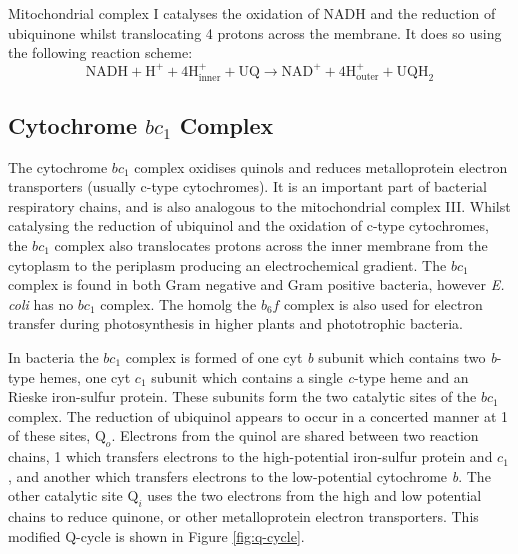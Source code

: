 Mitochondrial complex I catalyses the oxidation of NADH and the reduction of ubiquinone whilst translocating 4 protons across the membrane. It does so using the following reaction scheme:
\begin{equation}
\mathrm{NADH} + \mathrm{H}^+ + 4\mathrm{H}^+_{\mathrm{inner}} + \mathrm{UQ} \rightarrow \mathrm{NAD}^+ + 4\mathrm{H}^+_{\mathrm{outer}} + \mathrm{UQH}_2
\end{equation}

\subsection{Cytochrome $bc_\mathrm{1}$ Complex}
The cytochrome $bc_\mathrm{1}$ complex oxidises quinols and reduces metalloprotein electron transporters (usually c-type cytochromes). It is an important part of bacterial respiratory chains, and is also analogous to the mitochondrial complex III\cite{Thoeny-Meyer1997}. Whilst catalysing the reduction of ubiquinol and the oxidation of c-type cytochromes, the $bc_\mathrm{1}$ complex also translocates protons across the inner membrane from the cytoplasm to the periplasm producing an electrochemical gradient. The $bc_\mathrm{1}$ complex is found in both Gram negative and Gram positive bacteria, however \textit{E. coli} has no $bc_\mathrm{1}$ complex. The homolg the $b_6f$ complex is also used for electron transfer during photosynthesis in higher plants and phototrophic bacteria\cite{Darrouzet1999}.

In bacteria the $bc_1$ complex is formed of one cyt \textit{b} subunit which contains two \textit{b}-type hemes, one cyt $c_1$ subunit which contains a single \textit{c}-type heme and an Rieske iron-sulfur protein. These subunits form the two catalytic sites of the $bc_1$ complex. The reduction of ubiquinol appears to occur in a concerted manner at 1 of these sites, $\mathrm{Q}_o$\cite{Darrouzet1999}. Electrons from the quinol are shared between two reaction chains, 1 which transfers electrons to the high-potential iron-sulfur protein and $c_1$, and another which transfers electrons to the low-potential cytochrome \textit{b}. The other catalytic site $\mathrm{Q}_i$ uses the two electrons from the high and low potential chains to reduce quinone, or other metalloprotein electron transporters\cite{Snyder2000,Berry2011}. This modified Q-cycle is shown in Figure \ref{fig:q-cycle}.

